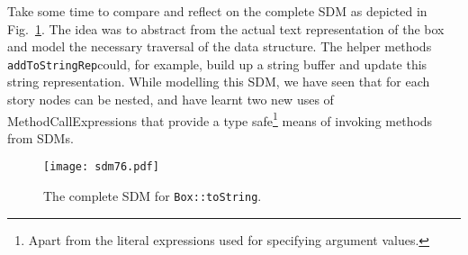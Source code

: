
Take some time to compare and reflect on the complete SDM as depicted in Fig.~\ref{fig:sdm_tostring_5}.  The idea was to abstract from the actual text
representation of the box and model the necessary traversal of the data structure. The helper methods \texttt{addToStringRep}could, for example, build up a
string buffer and update this string representation. While modelling this SDM, we have seen that for each story nodes can be nested, and have learnt two new
uses of MethodCallExpressions that provide a type safe\footnote{Apart from the literal expressions used for specifying argument values.} means of invoking
methods from SDMs.

\begin{figure}[htbp]
\begin{center}
  \texttt{[image: sdm76.pdf]}
  \caption{The complete SDM for \texttt{Box::toString}.}  
  \label{fig:sdm_tostring_5}
\end{center}
\end{figure}
\FloatBarrier